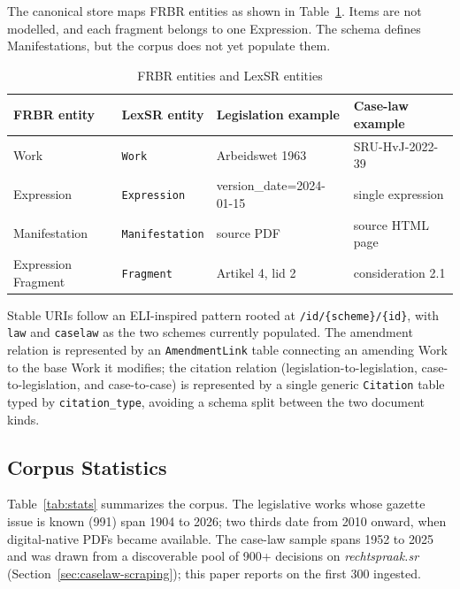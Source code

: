 \documentclass{IOS-Book-Article}
\begin{document}
The canonical store maps FRBR entities as shown in Table~\ref{tab:frbr}. Items are not
modelled, and each fragment belongs to one Expression. The schema defines Manifestations,
but the corpus does not yet populate them.

\begin{table}[h]
\caption{FRBR entities and LexSR entities}
\label{tab:frbr}
\begin{tabular}{|l|l|l|l|}
\hline
\textbf{FRBR entity} & \textbf{LexSR entity} & \textbf{Legislation example} & \textbf{Case-law example} \\
\hline
Work & \texttt{Work} & Arbeidswet 1963 & SRU-HvJ-2022-39 \\
Expression & \texttt{Expression} & version\_date=2024-01-15 & single expression \\
Manifestation & \texttt{Manifestation} & source PDF & source HTML page \\
Expression Fragment & \texttt{Fragment} & Artikel 4, lid 2 & consideration 2.1 \\
\hline
\end{tabular}
\end{table}

Stable URIs follow an ELI-inspired pattern rooted at \texttt{/id/\{scheme\}/\{id\}}, with
\texttt{law} and \texttt{caselaw} as the two schemes currently populated. The amendment relation is
represented by an \texttt{AmendmentLink} table connecting an amending Work to the base Work it
modifies; the citation relation (legislation-to-legislation, case-to-legislation, and
case-to-case) is represented by a single generic \texttt{Citation} table typed by
\texttt{citation\_type}, avoiding a schema split between the two document kinds.

\subsection{Corpus Statistics}

Table~\ref{tab:stats} summarizes the corpus. The legislative works whose gazette issue is known (991) span 1904 to 2026; two thirds
date from 2010 onward, when digital-native PDFs became available. The case-law
sample spans 1952 to 2025 and was drawn from a discoverable pool of 900+ decisions on
\emph{rechtspraak.sr} (Section~\ref{sec:caselaw-scraping}); this paper reports on the first 300 ingested.
\end{document}
